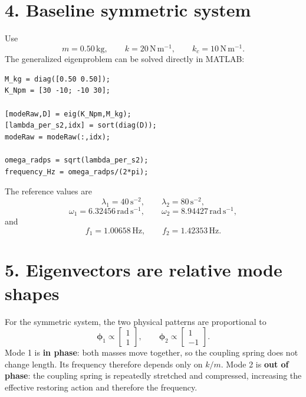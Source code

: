 \documentclass[11pt,a4paper]{article}
\begin{document}
\section*{4. Baseline symmetric system}
Use
\begin{equation}
 m=0.50\,\mathrm{kg},\qquad k=20\,\mathrm{N\,m^{-1}},\qquad k_c=10\,\mathrm{N\,m^{-1}}.
\end{equation}
The generalized eigenproblem can be solved directly in MATLAB:
\begin{lstlisting}[style=matlabstyle,caption={Generalized eigenproblem for the two-mass oscillator}]
M_kg = diag([0.50 0.50]);
K_Npm = [30 -10; -10 30];

[modeRaw,D] = eig(K_Npm,M_kg);
[lambda_per_s2,idx] = sort(diag(D));
modeRaw = modeRaw(:,idx);

omega_radps = sqrt(lambda_per_s2);
frequency_Hz = omega_radps/(2*pi);
\end{lstlisting}
The reference values are
\begin{equation}
 \lambda_1=40\,\mathrm{s^{-2}},\qquad \lambda_2=80\,\mathrm{s^{-2}},
\end{equation}
\begin{equation}
 \omega_1=6.32456\,\mathrm{rad\,s^{-1}},\qquad
 \omega_2=8.94427\,\mathrm{rad\,s^{-1}},
\end{equation}
and
\begin{equation}
 f_1=1.00658\,\mathrm{Hz},\qquad f_2=1.42353\,\mathrm{Hz}.
\end{equation}

\section*{5. Eigenvectors are relative mode shapes}
For the symmetric system, the two physical patterns are proportional to
\begin{equation}
 \boldsymbol{\phi}_1\propto\begin{bmatrix}1\\1\end{bmatrix},
 \qquad
 \boldsymbol{\phi}_2\propto\begin{bmatrix}1\\-1\end{bmatrix}.
\end{equation}
Mode 1 is \textbf{in phase}: both masses move together, so the coupling spring does not change length. Its frequency therefore depends only on $k/m$. Mode 2 is \textbf{out of phase}: the coupling spring is repeatedly stretched and compressed, increasing the effective restoring action and therefore the frequency.
\end{document}
